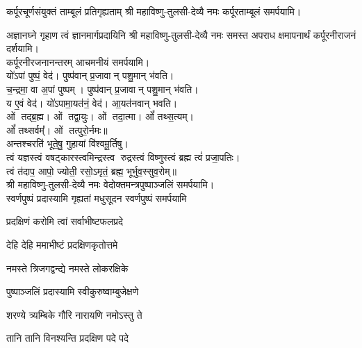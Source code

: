 {कर्पूरचूर्णसंयुक्तं ताम्बूलं प्रतिगृह्यताम्}
श्री महाविष्णु-तुलसी-देव्यै नमः कर्पूरताम्बूलं समर्पयामि।

{अज्ञानघ्ने गृहाण त्वं ज्ञानमार्गप्रदायिनि}
श्री महाविष्णु-तुलसी-देव्यै नमः समस्त अपराध क्षमापनार्थं कर्पूरनीराजनं दर्शयामि।\\
कर्पूरनीरजनानन्तरम् आचमनीयं समर्पयामि।\\

यो॑ऽपां पुष्पं॒ वेद॑। पुष्प॑वान् प्र॒जावान् पशु॒मान् भ॑वति।\\
च॒न्द्रमा॒ वा अ॒पां पुष्पम्। पुष्प॑वान् प्र॒जावान् पशु॒मान् भ॑वति।\\
य ए॒वं वेद॑। यो॑ऽपामा॒यत॑नं॒ वेद॑। आ॒यत॑नवान् भवति।\\

ओं तद्ब्र॒ह्म। ओं तद्वा॒युः। ओं तदा॒त्मा। ओं᳚ तथ्स॒त्यम्‌।\\
ओं᳚ तथ्सर्वम्᳚‌। ओं तत्पुरो॒र्नमः॥\\

अन्तश्चरति॑ भूते॒षु॒ गुहायां वि॑श्वमू॒र्तिषु। \\
त्वं यज्ञस्त्वं वषट्कारस्त्वमिन्द्रस्त्व रुद्रस्त्वं विष्णुस्त्वं ब्रह्म त्वं॑ प्रजा॒पतिः। \\
त्वं त॑दाप॒ आपो॒ ज्योती॒ रसो॒ऽमृतं॒ ब्रह्म॒ भूर्भुव॒स्सुव॒रोम्‌॥\\

श्री महाविष्णु-तुलसी-देव्यै नमः वेदोक्तमन्त्रपुष्पाञ्जलिं समर्पयामि।\\

{स्वर्णपुष्पं प्रदास्यामि गृह्यतां मधुसूदन}
स्वर्णपुष्पं समर्पयामि

{प्रदक्षिणं करोमि त्वां सर्वाभीष्टफलप्रदे}

{देहि देहि ममाभीष्टं प्रदक्षिणकृतोत्तमे}

{नमस्ते त्रिजगद्वन्द्ये नमस्ते लोकरक्षिके}

{पुष्पाञ्जलिं प्रदास्यामि स्वीकुरुष्वाम्बुजेक्षणे}

{शरण्ये त्र्यम्बिके गौरि नारायणि नमोऽस्तु ते}


{तानि तानि विनश्यन्ति प्रदक्षिण पदे पदे}

